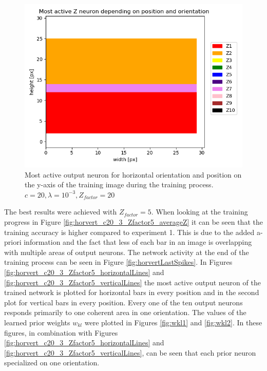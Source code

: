 \begin{figure}
  \includegraphics[width=\linewidth]{figures/horvert/horvert_c20_3_Zfactor20_horizontalLines.png}
  \caption{Most active output neuron for horizontal orientation and position on the y-axis of the training image during the training process. $c = 20, \lambda = 10^{-3}, Z_{factor} = 20$}
  \label{fig:horvert_c20_3_Zfactor20_horizontalLines}
\end{figure}


The best results were achieved with $Z_{factor} = 5$. When looking at the training progress in Figure \ref{fig:horvert_c20_3_Zfactor5_averageZ} it can be seen that the training accuracy is higher compared to experiment 1. This is due to the added a-priori information and the fact that less of each bar in an image is overlapping with multiple areas of output neurons. The network activity at the end of the training process can be seen in Figure \ref{fig:horvertLastSpikes}. In Figures \ref{fig:horvert_c20_3_Zfactor5_horizontalLines} and \ref{fig:horvert_c20_3_Zfactor5_verticalLines} the most active output neuron of the trained network is plotted for horizontal bars in every position and in the second plot for vertical bars in every position. Every one of the ten output neurons responds primarily to one coherent area in one orientation. The values of the learned prior weights $w_{kl}$ were plotted in Figures \ref{fig:wkl1} and \ref{fig:wkl2}. In these figures, in combination with Figures \ref{fig:horvert_c20_3_Zfactor5_horizontalLines} and \ref{fig:horvert_c20_3_Zfactor5_verticalLines}, can be seen that each prior neuron specialized on one orientation.

